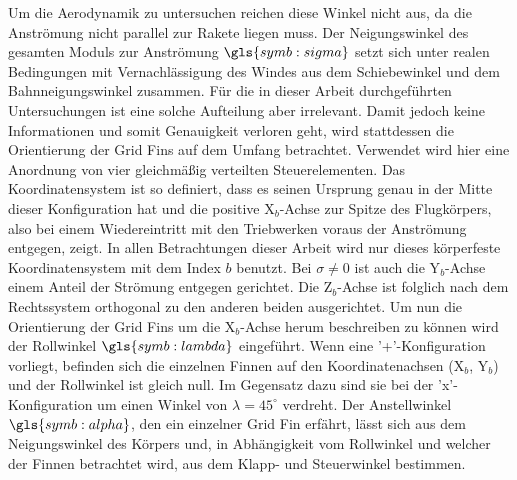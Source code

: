 Um die Aerodynamik zu untersuchen reichen diese Winkel nicht aus, da die Anströmung nicht parallel zur Rakete liegen muss. Der Neigungswinkel des gesamten Moduls zur Anströmung $\gls{symb:sigma}$ setzt sich unter realen Bedingungen mit Vernachlässigung des Windes aus dem Schiebewinkel und dem Bahnneigungswinkel zusammen. Für die in dieser Arbeit durchgeführten Untersuchungen ist eine solche Aufteilung aber irrelevant. Damit jedoch keine Informationen und somit Genauigkeit verloren geht, wird stattdessen die Orientierung der Grid Fins auf dem Umfang betrachtet. Verwendet wird hier eine Anordnung von vier gleichmäßig verteilten Steuerelementen. Das Koordinatensystem ist so definiert, dass es seinen Ursprung genau in der Mitte dieser Konfiguration hat und die positive X$_b$-Achse zur Spitze des Flugkörpers, also bei einem Wiedereintritt mit den Triebwerken voraus der Anströmung entgegen, zeigt. In allen Betrachtungen dieser Arbeit wird nur dieses körperfeste Koordinatensystem mit dem Index $b$ benutzt. Bei $\sigma \neq 0$ ist auch die Y$_b$-Achse einem Anteil der Strömung entgegen gerichtet. Die Z$_b$-Achse ist folglich nach dem Rechtssystem orthogonal zu den anderen beiden ausgerichtet. Um nun die Orientierung der Grid Fins um die X$_b$-Achse herum beschreiben zu können wird der Rollwinkel $\gls{symb:lambda}$ eingeführt. Wenn eine '+'-Konfiguration vorliegt, befinden sich die einzelnen Finnen auf den Koordinatenachsen (X$_b$, Y$_b$) und der Rollwinkel ist gleich null. Im Gegensatz dazu sind sie bei der 'x'-Konfiguration um einen Winkel von $\lambda = 45^\circ$ verdreht. Der Anstellwinkel $\gls{symb:alpha}$, den ein einzelner Grid Fin erfährt, lässt sich aus dem Neigungswinkel des Körpers und, in Abhängigkeit vom Rollwinkel und welcher der Finnen betrachtet wird, aus dem Klapp- und Steuerwinkel bestimmen.


